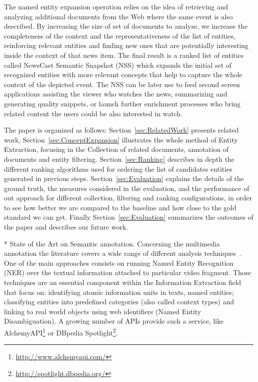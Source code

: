 \documentclass{llncs}
\begin{document}
The named entity expansion operation relies on the idea of retrieving and analyzing additional documents from the Web where the same event is also described. By increasing the size of set of documents to analyze, we increase the completeness of the context and the representativeness of the list of entities, reinforcing relevant entities and finding new ones that are potentially interesting inside the context of that news item. The final result is a ranked list of entities called NewsCast Semantic Snapshot (NSS) which expands the initial set of recognized entities with more relevant concepts that help to capture the whole context of the depicted event. The NSS can be later use to feed second screen applications assisting the viewer who watches the news, summarizing and generating quality snippets, or launch further  enrichment processes who bring related content the users could be also interested in watch. 

The paper is organized as follows: Section~\ref{sec:RelatedWork} presents related work, Section~\ref{sec:ConceptExpansion} illustrates the whole method of Entity Extraction, focusing in the Collection of related documents, annotation of documents and entity filtering. Section~\ref{sec:Ranking} describes in depth the different ranking algorithms used for ordering the list of candidates entities generated in previous steps. Section~\ref{sec:Evaluation} explains the details of the ground truth, the measures considered in the evaluation, and the performance of out approach for different collection, filtering and ranking configurations, in order to see how better we are compared to the baseline and how close to the gold standard we can get. Finally Section~\ref{sec:Evaluation} summarizes the outcomes of the paper and describes our future work.

* State of the Art on Semantic annotation.
Concerning the multimedia annotation the literature covers a wide range of different analysis techniques~\cite{ballan2011event}. One of the main approaches consists on running Named Entity Recognition (NER) over the textual information attached to particular video fragment. Those techniques are an essential component within the Information Extraction field that focus on: identifying atomic information units in texts, named entities; classifying entities into predefined categories (also called context types) and linking to real world objects using web identifiers (Named Entity Disambiguation). A growing number of APIs provide such a service, like AlchemyAPI\footnote{\fontsize{8pt}{1em}\selectfont \url{http://www.alchemyapi.com/}} or DBpedia Spotlight\footnote{\fontsize{8pt}{1em}\selectfont \url{http://spotlight.dbpedia.org/}}. 
\end{document}

